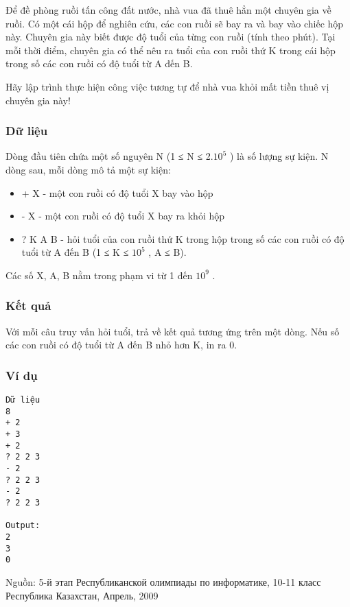 



   Để đề phòng ruồi tấn công đất nước, nhà vua đã thuê hẳn một chuyên gia về ruồi. Có một cái hộp để nghiên cứu, các con ruồi sẽ bay ra và bay vào chiếc hộp này. Chuyên gia này biết được độ tuổi của từng con ruồi (tính theo phút). Tại mỗi thời điểm, chuyên gia có thể nêu ra tuổi của con ruồi thứ K trong cái hộp trong số các con ruồi có độ tuổi từ A đến B.  

   Hãy lập trình thực hiện công việc tương tự để nhà vua khỏi mất tiền thuê vị chuyên gia này!  

\subsubsection{   Dữ liệu  }

   Dòng đầu tiên chứa một số nguyên N (1 ≤ N ≤ 2.$10^{5}$   ) là số lượng sự kiện. N dòng sau, mỗi dòng mô tả một sự kiện:  
\begin{itemize}
	\item     + X - một con ruồi có độ tuổi X bay vào hộp   
	\item     - X - một con ruồi có độ tuổi X bay ra khỏi hộp   
	\item     ? K A B - hỏi tuổi của con ruồi thứ K trong hộp trong số các con ruồi có độ tuổi từ A đến B (1 ≤ K ≤ $10^{5}$    , A ≤ B).   
\end{itemize}

   Các số X, A, B nằm trong phạm vi từ 1 đến $10^{9}$   .  

\subsubsection{   Kết quả  }

   Với mỗi câu truy vấn hỏi tuổi, trả về kết quả tương ứng trên một dòng. Nếu số các con ruồi có độ tuổi từ A đến B nhỏ hơn K, in ra 0.  

\subsubsection{   Ví dụ  }
\begin{verbatim}
Dữ liệu
8			
+ 2		
+ 3		
+ 2		
? 2 2 3
- 2		
? 2 2 3
- 2		
? 2 2 3

Output:
2
3
0
\end{verbatim}

   Nguồn: 5-й этап Республиканской олимпиады по информатике, 10-11 класс Республика Казахстан, Апрель, 2009  
